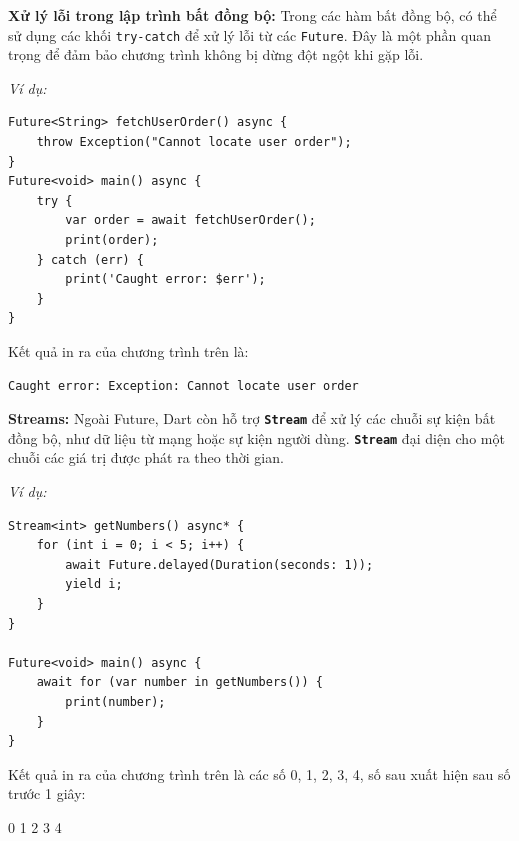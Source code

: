 \documentclass[../DoAn.tex]{subfiles}
\numberwithin{figure}{chapter}
\begin{document}
\textbf{Xử lý lỗi trong lập trình bất đồng bộ:}
Trong các hàm bất đồng bộ, có thể sử dụng các khối \texttt{try-catch} để xử lý lỗi từ các \texttt{Future}. Đây là một phần quan trọng để đảm bảo chương trình không bị dừng đột ngột khi gặp lỗi. 

\textit{Ví dụ:}
\begin{lstlisting}
Future<String> fetchUserOrder() async {
    throw Exception("Cannot locate user order");
}
Future<void> main() async {
    try {
        var order = await fetchUserOrder();
        print(order);
    } catch (err) {
        print('Caught error: $err');
    }
}
\end{lstlisting}

Kết quả in ra của chương trình trên là:
\begin{lstlisting}
Caught error: Exception: Cannot locate user order
\end{lstlisting}

\textbf{Streams:} Ngoài Future, Dart còn hỗ trợ \textbf{\texttt{Stream}} để xử lý các chuỗi sự kiện bất đồng bộ, như dữ liệu từ mạng hoặc sự kiện người dùng. \textbf{\texttt{Stream}} đại diện cho một chuỗi các giá trị được phát ra theo thời gian. 

\textit{Ví dụ:}
\begin{lstlisting}
Stream<int> getNumbers() async* {
    for (int i = 0; i < 5; i++) {
        await Future.delayed(Duration(seconds: 1));
        yield i;
    }
}

Future<void> main() async {
    await for (var number in getNumbers()) {
        print(number);
    }
}
\end{lstlisting}

Kết quả in ra của chương trình trên là các số 0, 1, 2, 3, 4, số sau xuất hiện sau số trước 1 giây:
\begin{myverbatim}
0 
1 
2 
3 
4 
\end{myverbatim}
\end{document}
